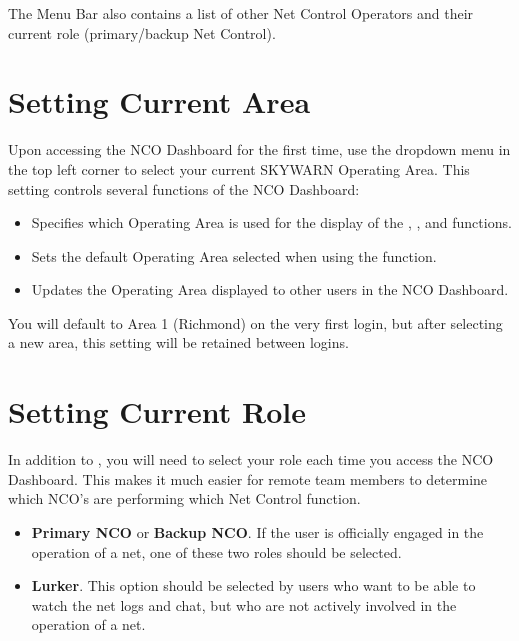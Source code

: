 \documentclass[pdflatex,letterpaper,twoside,12pt]{book}
\begin{document}
The Menu Bar also contains a list of other Net Control Operators and their current role (primary/backup Net Control).


\section{Setting Current Area}\label{dash-set-area}

Upon accessing the NCO Dashboard for the first time, use the dropdown menu in the top left corner to select your current SKYWARN Operating Area.  This setting controls several functions of the NCO Dashboard:

\begin{itemize}
\item Specifies which Operating Area is used for the display of the , , and  functions.
\item Sets the default Operating Area selected when using the  function.
\item Updates the Operating Area displayed to other users in the NCO Dashboard.
\end{itemize}

You will default to Area 1 (Richmond) on the very first login, but after selecting a new area, this setting will be retained between logins.


\section{Setting Current Role}\label{dash-set-role}

In addition to , you will need to select your role each time you access the NCO Dashboard.  This makes it much easier for remote team members to determine which NCO's are performing which Net Control function.

\begin{itemize}
\item {\bf Primary NCO} or {\bf Backup NCO}.  If the user is officially engaged in the operation of a net, one of these two roles should be selected.
\item {\bf Lurker}.  This option should be selected by users who want to be able to watch the net logs and chat, but who are not actively involved in the operation of a net.
\end{itemize}
\end{document}
